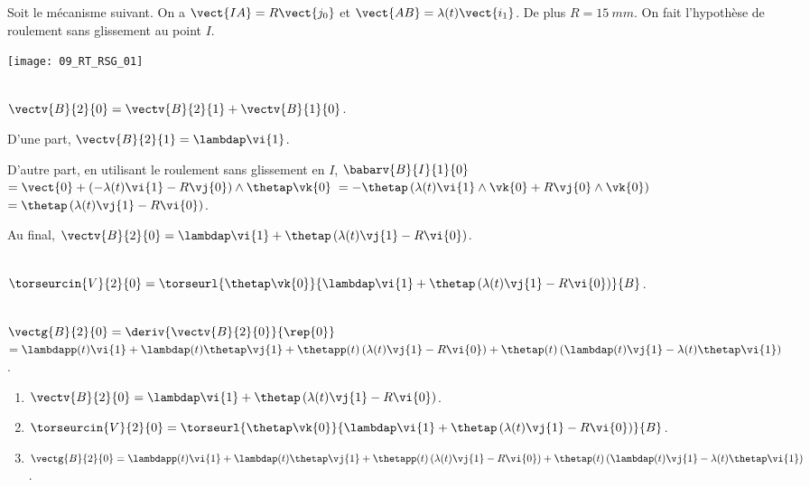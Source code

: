 \normalfalse \difficiletrue \tdifficilefalse
\correctiontrue


\setcounter{question}{0}%
\ifcorrection
\else
{}
\fi

\ifprof
\else
Soit le mécanisme suivant. On a $\vect{IA}=R\vect{j_0}$ et $\vect{AB}=\lambda(t)\vect{i_1}$. De plus $R=\SI{15}{mm}$.
On fait l'hypothèse de roulement sans glissement au point $I$.
\begin{marginfigure}
\texttt{[image: 09\_RT\_RSG\_01]}
\end{marginfigure}
\fi


\ifprof ~\\
$\vectv{B}{2}{0}=\vectv{B}{2}{1}+\vectv{B}{1}{0}$.

D'une part,  $\vectv{B}{2}{1}=\lambdap\vi{1}$.

D'autre part, en utilisant le roulement sans glissement en $I$, 
$\babarv{B}{I}{1}{0} $ $=\vect{0}+\left(-\lambda(t)\vi{1}-R\vj{0} \right)\wedge\thetap \vk{0}$
$=-\thetap\left(\lambda(t)\vi{1}\wedge \vk{0}+R\vj{0}\wedge \vk{0} \right)$
$=\thetap\left(\lambda(t)\vj{1}-R\vi{0} \right)$.

Au final, $\vectv{B}{2}{0} = \lambdap\vi{1} + \thetap\left(\lambda(t)\vj{1}-R\vi{0} \right)$.

\else
\fi

\ifprof ~\\
$\torseurcin{V}{2}{0}=\torseurl{\thetap \vk{0}}{ \lambdap\vi{1} + \thetap\left(\lambda(t)\vj{1}-R\vi{0} \right)}{B}$.
\else
\fi

\ifprof ~\\
$\vectg{B}{2}{0} = \deriv{\vectv{B}{2}{0}}{\rep{0}}$
$ = \lambdapp(t)\vi{1} +\lambdap(t)\thetap\vj{1} 
+ \thetapp(t)\left(\lambda(t)\vj{1}-R\vi{0} \right)
+ \thetap(t)\left(\lambdap(t)\vj{1}-\lambda(t)\thetap\vi{1} \right)
$.
\else
\fi

\ifprof
\else
\ifcolle
\else
\begin{solution}
\begin{enumerate}
\item $\vectv{B}{2}{0} = \lambdap\vi{1} + \thetap\left(\lambda(t)\vj{1}-R\vi{0} \right)$.
\item $\torseurcin{V}{2}{0}=\torseurl{\thetap \vk{0}}{ \lambdap\vi{1} + \thetap\left(\lambda(t)\vj{1}-R\vi{0} \right)}{B}$.
\item $\vectg{B}{2}{0}  = \lambdapp(t)\vi{1} +\lambdap(t)\thetap\vj{1} 
+ \thetapp(t)\left(\lambda(t)\vj{1}-R\vi{0} \right)
+ \thetap(t)\left(\lambdap(t)\vj{1}-\lambda(t)\thetap\vi{1} \right)
$.
\end{enumerate} 
\end{solution}
\fi

\fi